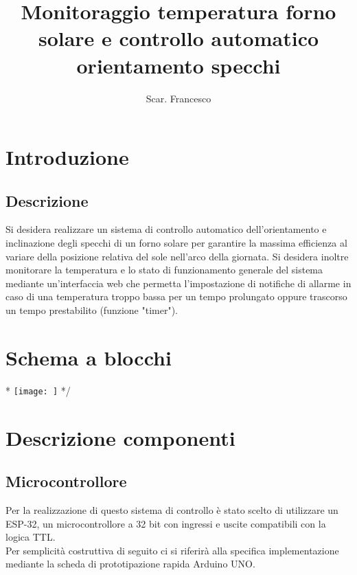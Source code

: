 \documentclass[12pt]{article}
\title{\textbf{Monitoraggio temperatura forno solare e controllo automatico orientamento specchi}}
\author{Scar. Francesco}
\date{}
\begin{document}
\maketitle

\tableofcontents{}

\newpage



\section{Introduzione}
    \subsection{Descrizione}
    Si desidera realizzare un sistema di controllo automatico dell'orientamento e inclinazione degli specchi di un forno solare per garantire la massima efficienza al variare della posizione relativa del sole nell'arco della giornata.
    Si desidera inoltre monitorare la temperatura e lo stato di funzionamento generale del sistema mediante un'interfaccia web che permetta l'impostazione di notifiche di allarme in caso di una temperatura troppo bassa per un tempo prolungato oppure trascorso un tempo prestabilito (funzione "timer").

\section{Schema a blocchi}

\/*
\noindent
\texttt{[image: ]}
*/

\vspace{0.5cm}
\noindent



\vfill



\section{Descrizione componenti}
    \subsection{Microcontrollore}
    Per la realizzazione di questo sistema di controllo è stato scelto di utilizzare un ESP-32, un microcontrollore a 32 bit con ingressi e uscite compatibili con la logica TTL.\\
    Per semplicità costruttiva di seguito ci si riferirà alla specifica implementazione me\-dian\-te la scheda di prototipazione rapida Arduino UNO.
\end{document}
